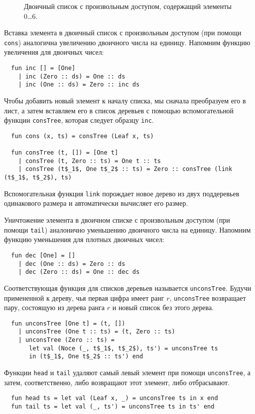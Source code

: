 \begin{figure}
  \centering
  
  \caption{Двоичный список с произвольным доступом, содержащий элементы 0\ldots 6.}
  \label{fig:9.5}
\end{figure}

Вставка элемента в двоичный список с произвольным доступом (при помощи
\lstinline!cons!) аналогична увеличению двоичного числа на
единицу. Напомним функцию увеличения для двоичных чисел:
\begin{lstlisting}
  fun inc [] = [One]
    | inc (Zero :: ds) = One :: ds
    | inc (One :: ds) = Zero :: inc ds
\end{lstlisting}
Чтобы добавить новый элемент к началу списка, мы сначала преобразуем
его в лист, а затем вставляем его в список деревьев с помощью
вспомогательной функции \lstinline!consTree!, которая следует образцу
\lstinline!inc!.
\begin{lstlisting}
  fun cons (x, ts) = consTree (Leaf x, ts)

  fun consTree (t, []) = [One t]
    | consTree (t, Zero :: ts) = One t :: ts
    | consTree (t$_1$, One t$_2$ :: ts) = Zero :: consTree (link (t$_1$, t$_2$), ts)
\end{lstlisting}
Вспомогательная функция \lstinline!link! порождает новое дерево из двух
поддеревьев одинакового размера и автоматически вычисляет его размер.

Уничтожение элемента в двоичном списке с произвольным доступом (при
помощи \lstinline!tail!) аналонично уменьшению двоичного числа на
единицу. Напомним функцию уменьшения для плотных двоичных чисел:
\begin{lstlisting}
  fun dec [One] = []
    | dec (One :: ds) = Zero :: ds
    | dec (Zero :: ds) = One :: dec ds
\end{lstlisting}
Соответствующая функция для списков деревьев называется
\lstinline!unconsTree!. Будучи примененной к дереву, чья первая цифра
имеет ранг $r$, \lstinline!unconsTree! возвращает пару, состоящую из
дерева ранга $r$ и новый список без этого дерева.
\begin{lstlisting}
  fun unconsTree [One t] = (t, [])
    | unconsTree (One t :: ts) = (t, Zero :: ts)
    | unconsTree (Zero :: ts) = 
       let val (Noce (_, t$_1$, t$_2$), ts') = unconsTree ts
       in (t$_1$, One t$_2$ :: ts') end
\end{lstlisting}
Функции \lstinline!head! и \lstinline!tail!  удаляют самый левый
элемент при помощи \lstinline!unconsTree!, а затем, соответственно,
либо возвращают этот элемент, либо отбрасывают.
\begin{lstlisting}
  fun head ts = let val (Leaf x, _) = unconsTree ts in x end
  fun tail ts = let val (_, ts') = unconsTree ts in ts' end
\end{lstlisting}

